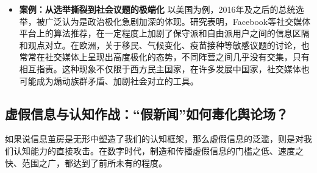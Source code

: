 \documentclass[UTF8, 10pt]{ctexbook}
\begin{document}
\begin{itemize}
    \item \textbf{案例：从选举撕裂到社会议题的极端化}
    以美国为例，2016年及之后的总统选举，被广泛认为是政治极化急剧加深的体现。研究表明，Facebook等社交媒体平台上的算法推荐，在一定程度上加剧了保守派和自由派用户之间的信息区隔和观点对立。在欧洲，关于移民、气候变化、疫苗接种等敏感议题的讨论，也常常在社交媒体上呈现出高度极化的态势，不同阵营之间几乎没有交集，只有相互指责。这种现象不仅限于西方民主国家，在许多发展中国家，社交媒体也可能成为煽动族群矛盾、加剧社会对立的工具。
\end{itemize}

\subsection{虚假信息与认知作战：“假新闻”如何毒化舆论场？}
如果说信息茧房是无形中塑造了我们的认知框架，那么虚假信息的泛滥，则是对我们认知能力的直接攻击。在数字时代，制造和传播虚假信息的门槛之低、速度之快、范围之广，都达到了前所未有的程度。
\end{document}
